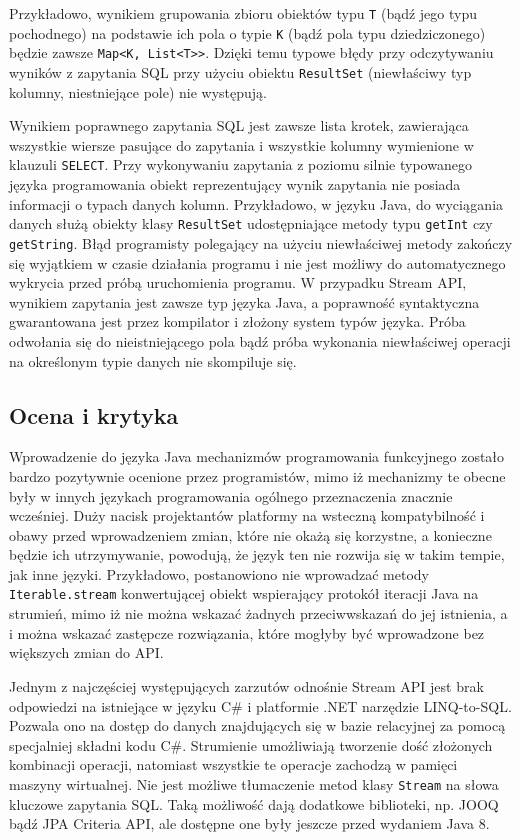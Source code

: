 \documentclass[12pt,twoside,openright]{extarticle}
\begin{document}
    Przykładowo, wynikiem grupowania zbioru obiektów typu \texttt{T} (bądź jego typu pochodnego) na podstawie ich pola o typie \texttt{K} (bądź pola typu dziedziczonego) będzie zawsze \texttt{Map<K, List<T>}\texttt{>}. Dzięki temu typowe błędy przy odczytywaniu wyników z zapytania SQL przy użyciu obiektu \texttt{ResultSet} (niewłaściwy typ kolumny, niestniejące pole) nie występują.

    Wynikiem poprawnego zapytania SQL jest zawsze lista krotek, zawierająca wszystkie wiersze pasujące do zapytania i wszystkie kolumny wymienione w klauzuli \texttt{SELECT}. Przy wykonywaniu zapytania z poziomu silnie typowanego języka programowania obiekt reprezentujący wynik zapytania nie posiada informacji o typach danych kolumn. Przykładowo, w języku Java, do wyciągania danych służą obiekty klasy \texttt{ResultSet} udostępniające metody typu \texttt{getInt} czy \texttt{getString}. Błąd programisty polegający na użyciu niewłaściwej metody zakończy się wyjątkiem w czasie działania programu i nie jest możliwy do automatycznego wykrycia przed próbą uruchomienia programu. W przypadku Stream API, wynikiem zapytania jest zawsze typ języka Java, a poprawność syntaktyczna gwarantowana jest przez kompilator i złożony system typów języka. Próba odwołania się do nieistniejącego pola bądź próba wykonania niewłaściwej operacji na określonym typie danych nie skompiluje się. 
\subsection{Ocena i krytyka}

    Wprowadzenie do języka Java mechanizmów programowania funkcyjnego zostało bardzo pozytywnie ocenione przez programistów, mimo iż mechanizmy te obecne były w innych językach programowania ogólnego przeznaczenia znacznie wcześniej. Duży nacisk projektantów platformy na wsteczną kompatybilność i obawy przed wprowadzeniem zmian, które nie okażą się korzystne, a konieczne będzie ich utrzymywanie, powodują, że język ten nie rozwija się w takim tempie, jak inne języki. Przykładowo, postanowiono nie wprowadzać metody \texttt{Iterable.stream} konwertującej obiekt wspierający protokół iteracji Java na strumień, mimo iż nie można wskazać żadnych przeciwwskazań do jej istnienia, a i można wskazać zastępcze rozwiązania, które mogłyby być wprowadzone bez większych zmian do API.

    Jednym z najczęściej występujących zarzutów odnośnie Stream API jest brak odpowiedzi na istniejące w języku C\# i platformie .NET narzędzie LINQ-to-SQL. Pozwala ono na dostęp do danych znajdujących się w bazie relacyjnej za pomocą specjalniej składni kodu C\#. Strumienie umożliwiają tworzenie dość złożonych kombinacji operacji, natomiast wszystkie te operacje zachodzą w pamięci maszyny wirtualnej. Nie jest możliwe tłumaczenie metod klasy \texttt{Stream} na słowa kluczowe zapytania SQL. Taką możliwość dają dodatkowe biblioteki, np. JOOQ bądź JPA Criteria API, ale dostępne one były jeszcze przed wydaniem Java 8. 
\end{document}
